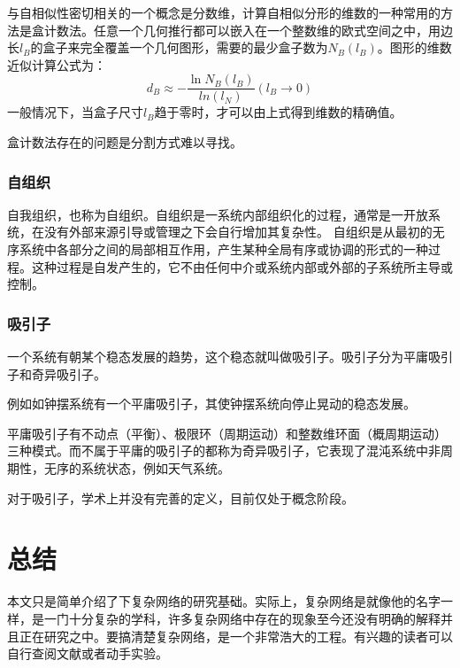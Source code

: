 \documentclass[11pt]{article}
\begin{document}
			与自相似性密切相关的一个概念是分数维，计算自相似分形的维数的一种常用的方法是盒计数法。任意一个几何推行都可以嵌入在一个整数维的欧式空间之中，用边长$l_B$的盒子来完全覆盖一个几何图形，需要的最少盒子数为$N_B(l_B)$。图形的维数近似计算公式为：
				$$d_B \approx - \frac{\ln N_B(l_B)}{ln(l_N)} (l_B \rightarrow 0)$$
			一般情况下，当盒子尺寸$l_B$趋于零时，才可以由上式得到维数的精确值。\par
			盒计数法存在的问题是分割方式难以寻找。
		
		\subsubsection*{自组织}
			自我组织，也称为自组织。自组织是一系统内部组织化的过程，通常是一开放系统，在没有外部来源引导或管理之下会自行增加其复杂性。 自组织是从最初的无序系统中各部分之间的局部相互作用，产生某种全局有序或协调的形式的一种过程。这种过程是自发产生的，它不由任何中介或系统内部或外部的子系统所主导或控制。
			
		\subsubsection*{吸引子}
			一个系统有朝某个稳态发展的趋势，这个稳态就叫做吸引子。吸引子分为平庸吸引子和奇异吸引子。\par
			例如如钟摆系统有一个平庸吸引子，其使钟摆系统向停止晃动的稳态发展。\par
			平庸吸引子有不动点（平衡）、极限环（周期运动）和整数维环面（概周期运动）三种模式。而不属于平庸的吸引子的都称为奇异吸引子，它表现了混沌系统中非周期性，无序的系统状态，例如天气系统。\par
			对于吸引子，学术上并没有完善的定义，目前仅处于概念阶段。
			
\section{总结}
	本文只是简单介绍了下复杂网络的研究基础。实际上，复杂网络是就像他的名字一样，是一门十分复杂的学科，许多复杂网络中存在的现象至今还没有明确的解释并且正在研究之中。要搞清楚复杂网络，是一个非常浩大的工程。有兴趣的读者可以自行查阅文献或者动手实验。
			
			
	

		
\end{document}
